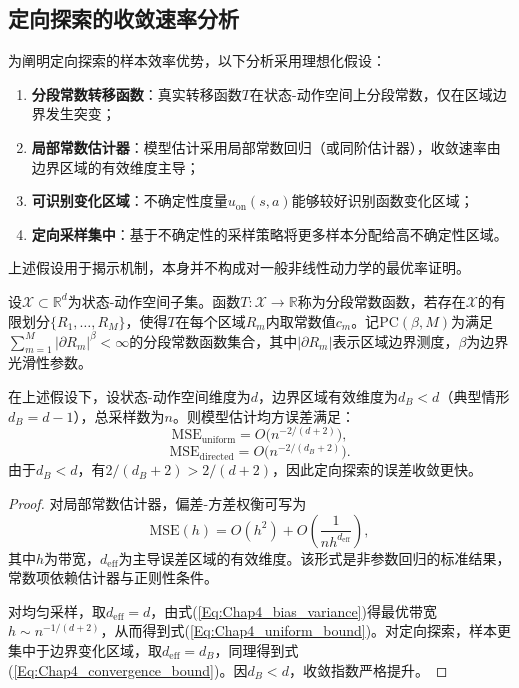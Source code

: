\subsection{定向探索的收敛速率分析}\label{Sec4.3.1}

为阐明定向探索的样本效率优势，以下分析采用理想化假设：
\begin{enumerate}
  \item \textbf{分段常数转移函数}：真实转移函数$T$在状态-动作空间上分段常数，仅在区域边界发生突变；
  \item \textbf{局部常数估计器}：模型估计采用局部常数回归（或同阶估计器），收敛速率由边界区域的有效维度主导；
  \item \textbf{可识别变化区域}：不确定性度量$u_{\mathrm{on}}(s,a)$能够较好识别函数变化区域；
  \item \textbf{定向采样集中}：基于不确定性的采样策略将更多样本分配给高不确定性区域。
\end{enumerate}
上述假设用于揭示机制，本身并不构成对一般非线性动力学的最优率证明。

\begin{defn}[分段常数函数]\label{Def:Chap4_piecewise_constant}
  设$\mathcal{X}\subset\mathbb{R}^d$为状态-动作空间子集。函数$T:\mathcal{X}\to\mathbb{R}$称为分段常数函数，若存在$\mathcal{X}$的有限划分$\{R_1,\ldots,R_M\}$，使得$T$在每个区域$R_m$内取常数值$c_m$。记$\mathrm{PC}(\beta,M)$为满足$\sum_{m=1}^{M}|\partial R_m|^\beta<\infty$的分段常数函数集合，其中$|\partial R_m|$表示区域边界测度，$\beta$为边界光滑性参数。
\end{defn}

\begin{thm}\label{Thm:Chap4_convergence}
  在上述假设下，设状态-动作空间维度为$d$，边界区域有效维度为$d_B<d$（典型情形$d_B=d-1$），总采样数为$n$。则模型估计均方误差满足：
  \begin{equation}\label{Eq:Chap4_uniform_bound}
    \mathrm{MSE}_{\mathrm{uniform}}=O\big(n^{-2/(d+2)}\big),
  \end{equation}
  \begin{equation}\label{Eq:Chap4_convergence_bound}
    \mathrm{MSE}_{\mathrm{directed}}=O\big(n^{-2/(d_B+2)}\big).
  \end{equation}
  由于$d_B<d$，有$2/(d_B+2)>2/(d+2)$，因此定向探索的误差收敛更快。
\end{thm}

\begin{proof}
  对局部常数估计器，偏差-方差权衡可写为
  \begin{equation}\label{Eq:Chap4_bias_variance}
    \mathrm{MSE}(h)=O(h^2)+O\!\left(\frac{1}{n h^{d_{\mathrm{eff}}}}\right),
  \end{equation}
  其中$h$为带宽，$d_{\mathrm{eff}}$为主导误差区域的有效维度。该形式是非参数回归的标准结果，常数项依赖估计器与正则性条件\cite{Korostelev1999Minimax}。

  对均匀采样，取$d_{\mathrm{eff}}=d$，由式(\ref{Eq:Chap4_bias_variance})得最优带宽$h\sim n^{-1/(d+2)}$，从而得到式(\ref{Eq:Chap4_uniform_bound})。对定向探索，样本更集中于边界变化区域，取$d_{\mathrm{eff}}=d_B$，同理得到式(\ref{Eq:Chap4_convergence_bound})。因$d_B<d$，收敛指数严格提升。
\end{proof}

